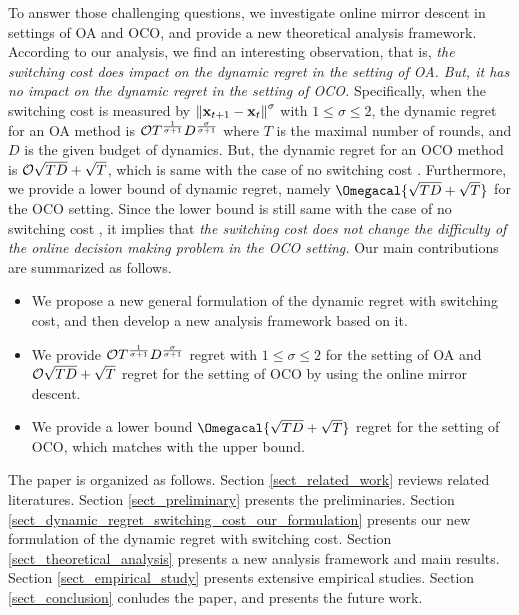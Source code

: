\documentclass[journal]{IEEEtran}
\begin{document}
To answer those challenging questions, we investigate online mirror descent in settings of OA and OCO, and provide a new theoretical analysis framework. According to our analysis, we find an interesting observation, that is, \textit{the switching cost does impact on the dynamic regret in the setting of OA. But, it has no impact on the dynamic regret in the setting of OCO.}  Specifically, when the switching cost is measured by $\left\lVert{\bf x}_{t+1} - {\bf x}_t\right\rVert^\sigma$ with $1\le \sigma \le 2$,  the dynamic regret for an OA method is ${\mathcal{O}}{T^{\frac{1}{\sigma + 1}} D^{\frac{\sigma}{\sigma+1}}}$ where $T$ is the maximal number of rounds, and $D$ is the given budget of dynamics. But, the dynamic regret for an OCO method is ${\mathcal{O}}{\sqrt{TD} + \sqrt{T}}$, which is same with the case of no switching cost \cite{Gyorgy:2016,Zhao:2018wx,Zinkevich:2003,Hall:2013vr}. Furthermore, we provide a lower bound of dynamic regret, namely $\Omegacal{\sqrt{TD} + \sqrt{T}}$ for the OCO setting. Since the lower bound is still same with the case of no switching cost \cite{Zhao:2018wx}, it implies that \textit{the switching cost does not change the difficulty of the online decision making problem in the OCO setting.} Our main contributions are summarized as follows.
\begin{itemize}
\item We propose a new general formulation of the dynamic regret with switching cost, and then develop a new analysis framework based on it.
\item We provide ${\mathcal{O}}{T^{\frac{1}{\sigma + 1}} D^{\frac{\sigma}{\sigma+1}}}$ regret with $1\le \sigma\le 2$ for the setting of OA and ${\mathcal{O}}{\sqrt{TD} + \sqrt{T}}$ regret for the setting of OCO by using the online mirror descent.
\item We provide a lower bound $\Omegacal{\sqrt{TD} + \sqrt{T}}$ regret for the setting of OCO, which matches with the upper bound.
\end{itemize}
  

The paper is organized as follows. Section \ref{sect_related_work} reviews related literatures. Section \ref{sect_preliminary} presents the preliminaries. Section \ref{sect_dynamic_regret_switching_cost_our_formulation} presents our new formulation of the dynamic regret with switching cost. Section \ref{sect_theoretical_analysis} presents a new analysis framework and main results. Section \ref{sect_empirical_study} presents extensive empirical studies. Section \ref{sect_conclusion} conludes the paper, and presents the future work.
\end{document}
